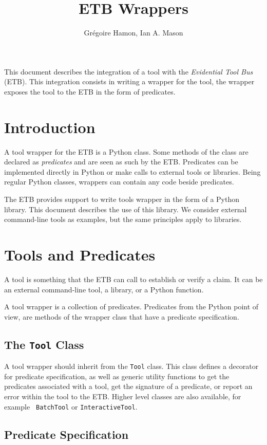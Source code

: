 \documentclass{article}
\title{ETB Wrappers}
\author{Gr\'egoire Hamon, Ian A. Mason}
\begin{document}
\maketitle

This document describes the integration of a tool with the {\it
  Evidential Tool Bus} (ETB). This integration consists in writing a
wrapper for the tool, the wrapper exposes the tool to the ETB in the
form of predicates.

\section{Introduction}

A tool wrapper for the ETB is a Python class. Some methods of the
class are declared as {\it predicates} and are seen as such by the
ETB. Predicates can be implemented directly in Python or make calls to
external tools or libraries. Being regular Python classes, wrappers
can contain any code beside predicates.

The ETB provides support to write tools wrapper in the form of a
Python library. This document describes the use of this library. We
consider external command-line tools as examples, but the same
principles apply to libraries.

\section{Tools and Predicates}

A tool is something that the ETB can call to establish or verify a
claim. It can be an external command-line tool, a library, or a Python
function. 

A tool wrapper is a collection of predicates. Predicates from the
Python point of view, are methods of the wrapper class that have a
predicate specification.

\subsection{The {\tt Tool} Class}

A tool wrapper should inherit from the {\tt Tool} class. This class
defines a decorator for predicate specification, as well as generic
utility functions to get the predicates associated with a tool, get
the signature of a predicate, or report an error within the tool to
the ETB. Higher level classes are also available, for example {\tt
  BatchTool} or {\tt InteractiveTool}.

\subsection{Predicate Specification}
\end{document}
